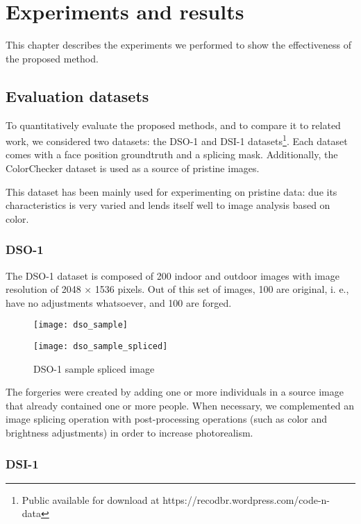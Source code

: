 \chapter{Experiments and results}

This chapter describes the experiments we performed to show the effectiveness of the proposed method. 

\section{Evaluation datasets}
To quantitatively evaluate the proposed methods, and to compare it to related work,
we considered two datasets: the DSO-1 and DSI-1 datasets\footnote{Public available for download at https://recodbr.wordpress.com/code-n-data}. Each dataset comes with a face position groundtruth and a splicing mask. Additionally, the ColorChecker dataset \cite{gehler2008bayesian} is used as a source of pristine images.


This dataset has been mainly used for experimenting on pristine data: due its characteristics is very varied and lends itself well to image analysis based on color.

\subsection{DSO-1}

The DSO-1 dataset is composed of 200 indoor and outdoor images with image resolution of 2048 × 1536 pixels. Out of this set of images, 100 are original, i. e., have no adjustments whatsoever, and 100 are forged. 

\begin{figure}[!htb]
  \texttt{[image: dso\_sample]}
  \caption{DSO-1 sample original image}\label{fig:dsooriginalimage}
\endminipage\hfill
{}
  \texttt{[image: dso\_sample\_spliced]}
  \caption{DSO-1 sample spliced image}\label{fig:dsosplicedimage}
\endminipage
\end{figure}

The forgeries were created by adding one or more individuals in a source image that already contained one or more people. When necessary, we complemented an image splicing operation with post-processing operations (such as color and brightness adjustments) in order to increase photorealism.

\subsection{DSI-1}

